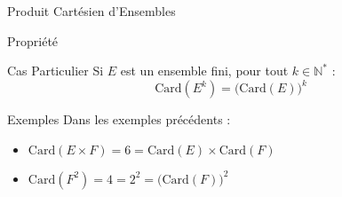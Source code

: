 \documentclass{cours}
\begin{document}
\begin{Gpartie}{Produit Cartésien d'Ensembles}
\begin{Spartie}{Propriété}
            \begin{SSpartie}{Cas Particulier}
                Si $E$ est un ensemble fini, pour tout $k\in\mathbb{N^*}$ :
                \[\text{Card}(E^k)=\big(\text{Card}(E)\big)^k\]
            \end{SSpartie}
            \pagebreak
            \begin{SSpartie}{Exemples}
                Dans les exemples précédents :
                \begin{itemize}
                    \item $\text{Card}(E\times F)=6=\text{Card}(E)\times\text{Card}(F)$
                    \item $\text{Card}(F^2)=4=2^2=\big(\text{Card}(F)\big)^2$
                \end{itemize}
            \end{SSpartie}
        \end{Spartie}
    \end{Gpartie}
    \pagebreak[3]
\end{document}
